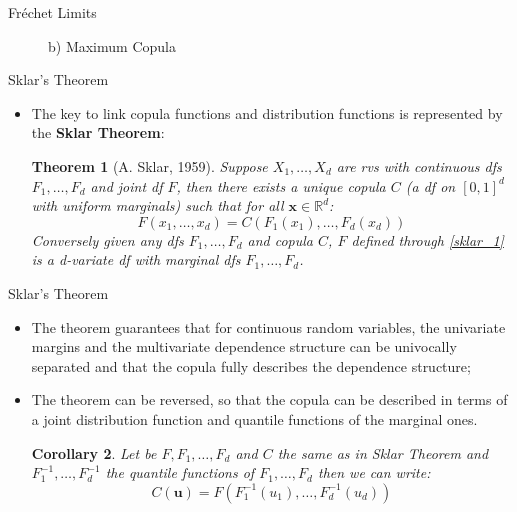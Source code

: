 \documentclass[11pt]{beamer}
\theoremstyle{plain}
\newtheorem{thm}{Theorem}[section]
\newtheorem{cor}[thm]{Corollary}
\theoremstyle{definition}
\theoremstyle{remark}
\begin{document}
\begin{frame}{Fréchet Limits}
\begin{figure}[ht]
\begin{minipage}[b]{0.45\linewidth}
            \caption{b) Maximum Copula}
            \label{fig:b}
        \end{minipage}
    \end{figure}
\end{frame}
%
\begin{frame}{Sklar's Theorem}
   \begin{itemize}
      \item  The key to link copula functions and distribution functions is represented by the \textbf{Sklar Theorem}:
	  \begin{thm}[A. Sklar, 1959]
			Suppose $X_1, \dots, X_d$ are rvs with continuous dfs $F_1, \dots, F_d$ and joint df $F$, then there exists a unique copula $C$ 
			(a df on $[0, 1]^d$ with uniform marginals) such that for all $\mathbf{x} \in \mathbb{R}^d$: 
					\begin{equation}\label{sklar_1}
							F(x_1,\dots,x_d) = C(F_1(x_1),\dots,F_d(x_d))
					\end{equation}
			Conversely given any dfs $F_1, \dots, F_d$ and copula $C$, $F$ defined through \eqref{sklar_1} is a d-variate df with marginal dfs  
			$F_1,\dots,F_d$.
	\end{thm} 
   \end{itemize}
\end{frame}
%
\begin{frame}{Sklar's Theorem}
   \begin{itemize}
      \item 
      	The theorem guarantees that for continuous random variables, the univariate margins 
      	and the multivariate dependence structure can be univocally separated and that the 
      	copula fully describes the dependence structure;  				  							  \item 
      	The theorem can be reversed, so that the copula can be described in terms of a joint 
      	distribution function and quantile functions of the marginal ones.
		\begin{cor}
			Let be $F, F_1, \dots, F_d$ and $C$ the same as in Sklar Theorem and $F_1^{-1}, 
			\dots, F_d^{-1}$ the quantile functions of $F_1, \dots, F_d$ then we can write:
			\begin{equation}\label{sklar_2}
							C(\mathbf{u}) = F(F_1^{-1}(u_1), \dots, F_d^{-1}(u_d)) 
			\end{equation}  
		\end{cor} 
   \end{itemize}
\end{frame}
\end{document}
